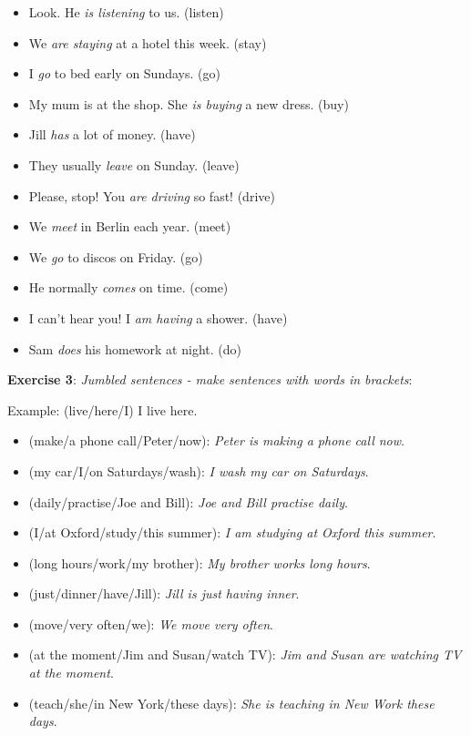 \begin{itemize}

\item Look. He \textit{is listening} to us. (listen)
\item We \textit{are staying} at a hotel this week. (stay)
\item I \textit{go} to bed early on Sundays. (go)
\item My mum is at the shop. She \textit{is buying} a new dress. (buy)
\item Jill \textit{has} a lot of money. (have)
\item They usually \textit{leave} on Sunday. (leave)
\item Please, stop! You \textit{are driving} so fast! (drive)
\item We \textit{meet} in Berlin each year. (meet)
\item We \textit{go} to discos on Friday. (go)
\item He normally \textit{comes} on time. (come)
\item I can't hear you! I \textit{am having} a shower. (have)
\item Sam \textit{does} his homework at night. (do)

\end{itemize}

\textbf{Exercise 3}: \textit{Jumbled sentences - make sentences with words in brackets}:

Example:
(live/here/I) 
I live here.

\begin{itemize}

\item (make/a phone call/Peter/now): \textit{Peter is making a phone call now}.
\item (my car/I/on Saturdays/wash): \textit{I wash my car on Saturdays}.
\item (daily/practise/Joe and Bill): \textit{Joe and Bill practise daily}.
\item (I/at Oxford/study/this summer): \textit{I am studying at Oxford this summer}.
\item (long hours/work/my brother): \textit{My brother works long hours}.
\item (just/dinner/have/Jill): \textit{Jill is just having inner}.
\item (move/very often/we): \textit{We move very often}.
\item (at the moment/Jim and Susan/watch TV): \textit{Jim and Susan are watching TV at the moment}.
\item (teach/she/in New York/these days): \textit{She is teaching in New Work these days}.

\end{itemize}

